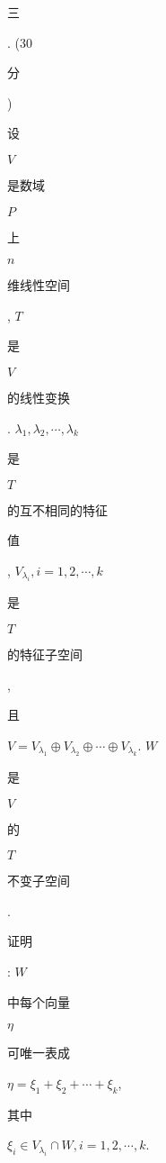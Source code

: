 \documentclass[10pt]{article}
\begin{document}
\begin{CJK}{UTF8}{mj}三\end{CJK}. (30 \begin{CJK}{UTF8}{mj}分\end{CJK}) \begin{CJK}{UTF8}{mj}设\end{CJK} $V$ \begin{CJK}{UTF8}{mj}是数域\end{CJK} $P$ \begin{CJK}{UTF8}{mj}上\end{CJK} $n$ \begin{CJK}{UTF8}{mj}维线性空间\end{CJK}, $T$ \begin{CJK}{UTF8}{mj}是\end{CJK} $V$ \begin{CJK}{UTF8}{mj}的线性变换\end{CJK}. $\lambda_{1}, \lambda_{2}, \cdots, \lambda_{k}$ \begin{CJK}{UTF8}{mj}是\end{CJK} $T$ \begin{CJK}{UTF8}{mj}的互不相同的特征\end{CJK} \begin{CJK}{UTF8}{mj}值\end{CJK}, $V_{\lambda_{i}}, i=1,2, \cdots, k$ \begin{CJK}{UTF8}{mj}是\end{CJK} $T$ \begin{CJK}{UTF8}{mj}的特征子空间\end{CJK}, \begin{CJK}{UTF8}{mj}且\end{CJK} $V=V_{\lambda_{1}} \oplus V_{\lambda_{2}} \oplus \cdots \oplus V_{\lambda_{k}}$. $W$ \begin{CJK}{UTF8}{mj}是\end{CJK} $V$ \begin{CJK}{UTF8}{mj}的\end{CJK} $T$ \begin{CJK}{UTF8}{mj}不变子空间\end{CJK}. \begin{CJK}{UTF8}{mj}证明\end{CJK}: $W$ \begin{CJK}{UTF8}{mj}中每个向量\end{CJK} $\eta$ \begin{CJK}{UTF8}{mj}可唯一表成\end{CJK} $\eta=\xi_{1}+\xi_{2}+\cdots+\xi_{k}$, \begin{CJK}{UTF8}{mj}其中\end{CJK} $\xi_{i} \in V_{\lambda_{i}} \cap W, i=1,2, \cdots, k$.
\end{document}
